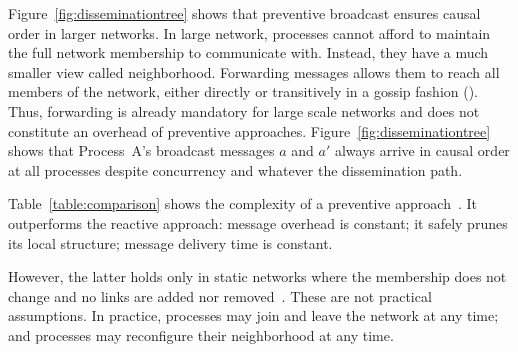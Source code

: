 Figure~\ref{fig:disseminationtree} shows that preventive broadcast ensures
causal order in larger networks. In large network, processes cannot afford to
maintain the full network membership to communicate with. Instead, they have a
much smaller view called neighborhood. Forwarding messages allows them to reach
all members of the network, either directly or transitively in a gossip fashion
(\REF). Thus, forwarding is already mandatory for large scale networks and does
not constitute an overhead of preventive approaches.
Figure~\ref{fig:disseminationtree} shows that Process~A's broadcast messages $a$
and $a'$ always arrive in causal order at all processes despite concurrency and
whatever the dissemination path.



Table~\ref{table:comparison} shows the complexity of a preventive
approach~\cite{friedman2004causal}. It outperforms the reactive approach:
message overhead is constant; it safely prunes its local structure; message
delivery time is constant.

However, the latter holds only in static networks where the membership does not
change and no links are added nor removed~\cite{friedman2004causal}. These are
not practical assumptions.  In practice, processes may join and leave the
network at any time; and processes may reconfigure their neighborhood at any
time.




%     

